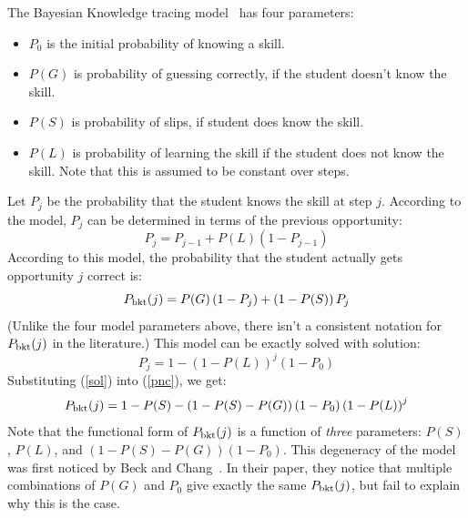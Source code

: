 \documentclass[11pt,letterpaper]{article}
\begin{document}
\begin{tabular}
The Bayesian Knowledge tracing model~\cite{anderson} has four parameters:
%
\begin{itemize}
   \item $P_0$ is the initial probability of knowing a skill.
   \item $P(G)$ is probability of guessing correctly, if the student        
         doesn't know the skill.
   \item $P(S)$ is probability of slips, if student does know the skill.
   \item $P(L)$ is probability of learning the skill if the student 
         does not know the skill.  Note that this is assumed to 
         be constant over steps.
\end{itemize}
%
Let $P_j$ be the probability that the student knows the skill at 
step $j$. According to the model,  $P_j$ can
be determined in terms of the previous opportunity:
%
\begin{equation}
          P_j = P_{j-1} + P(L)\left(1-P_{j-1}\right)
\end{equation}
%
According to this model, the probability that the student actually gets
opportunity $j$ correct is:
%
\begin{equation}
        P_{\rm bkt}(j) = P(G)\left(1-P_j\right) + 
                     \left(1-P(S)\right) P_j \label{pnc}
\end{equation}
%
(Unlike the four model parameters above, there isn't a consistent
notation for $P_{\rm bkt}(j)$ in the literature.)
This model can be exactly solved with solution: 
%
\begin{equation}
            P_j = 1-\left(1-P(L)\right)^j\left(1-P_0\right)
	    \label{sol}
\end{equation}
%
%
Substituting (\ref{sol}) into (\ref{pnc}), we get:
%
\begin{equation}
         P_{\rm bkt}(j) = 1-P(S) -\left(1-P(S)-P(G)\right) \left(1-P_0\right)
                   \left(1-P(L)\right)^j \label{pncsoln}
\end{equation}
%
Note that the functional form of $P_{\rm bkt}(j)$ is a function of {\em three}
parameters:  $P(S)$, $P(L)$, and $\left(1-P(S)-P(G)\right) \left(1-P_0\right)$.
This degeneracy of the model was first noticed by Beck and 
Chang~\cite{beckchang}.  In their paper, they notice that multiple
combinations of $P(G)$ and $P_0$ give exactly the same $P_{\rm bkt}(j)$, but
fail to explain why this is the case.


\end{tabular}
\end{document}
